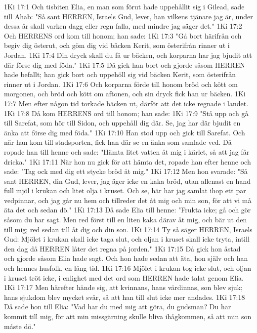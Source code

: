 1Ki 17:1  Och tisbiten Elia, en man som förut hade uppehållit sig i Gilead, sade till Ahab: "Så sant HERREN, Israels Gud, lever, han vilkens tjänare jag är, under dessa år skall varken dagg eller regn falla, med mindre jag säger det."
1Ki 17:2  Och HERRENS ord kom till honom; han sade:
1Ki 17:3  "Gå bort härifrån och begiv dig österut, och göm dig vid bäcken Kerit, som österifrån rinner ut i Jordan.
1Ki 17:4  Din dryck skall du få ur bäcken, och korparna har jag bjudit att där förse dig med föda."
1Ki 17:5  Då gick han bort och gjorde såsom HERREN hade befallt; han gick bort och uppehöll sig vid bäcken Kerit, som österifrån rinner ut i Jordan.
1Ki 17:6  Och korparna förde till honom bröd och kött om morgonen, och bröd och kött om aftonen, och sin dryck fick han ur bäcken.
1Ki 17:7  Men efter någon tid torkade bäcken ut, därför att det icke regnade i landet.
1Ki 17:8  Då kom HERRENS ord till honom; han sade:
1Ki 17:9  "Stå upp och gå till Sarefat, som hör till Sidon, och uppehåll dig där. Se, jag har där bjudit en änka att förse dig med föda."
1Ki 17:10  Han stod upp och gick till Sarefat. Och när han kom till stadsporten, fick han där se en änka som samlade ved. Då ropade han till henne och sade: "Hämta litet vatten åt mig i kärlet, så att jag får dricka."
1Ki 17:11  När hon nu gick för att hämta det, ropade han efter henne och sade: "Tag ock med dig ett stycke bröd åt mig."
1Ki 17:12  Men hon svarade: "Så sant HERREN, din Gud, lever, jag äger icke en kaka bröd, utan allenast en hand full mjöl i krukan och litet olja i kruset. Och se, här har jag samlat ihop ett par vedpinnar, och jag går nu hem och tillreder det åt mig och min son, för att vi må äta det och sedan dö."
1Ki 17:13  Då sade Elia till henne: "Frukta icke; gå och gör såsom du har sagt. Men red först till en liten kaka därav åt mig, och bär ut den till mig; red sedan till åt dig och din son.
1Ki 17:14  Ty så säger HERREN, Israels Gud: Mjölet i krukan skall icke taga slut, och oljan i kruset skall icke tryta, intill den dag då HERREN låter det regna på jorden."
1Ki 17:15  Då gick hon åstad och gjorde såsom Elia hade sagt. Och hon hade sedan att äta, hon själv och han och hennes husfolk, en lång tid.
1Ki 17:16  Mjölet i krukan tog icke slut, och oljan i kruset tröt icke, i enlighet med det ord som HERREN hade talat genom Elia.
1Ki 17:17  Men härefter hände sig, att kvinnans, hans värdinnas, son blev sjuk; hans sjukdom blev mycket svår, så att han till slut icke mer andades.
1Ki 17:18  Då sade hon till Elia: "Vad har du med mig att göra, du gudsman? Du har kommit till mig, för att min missgärning skulle bliva ihågkommen, så att min son måste dö."
